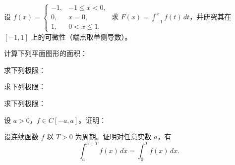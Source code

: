 \newpage
\noindent\begin{minipage}{\textwidth}
设 $f(x)=\begin{cases}-1,&-1\le x<0,\\0,&x=0,\\1,&0<x\le1.\end{cases}$ 求 $F(x)=\int_{-1}^x f(t)\,dt$，并研究其在 $[-1,1]$ 上的可微性（端点取单侧导数）。
\end{minipage}\par\vfill
\noindent\begin{minipage}{\textwidth}
计算下列平面图形的面积：
\end{minipage}\par\vfill
\noindent\begin{minipage}{\textwidth}
求下列极限：
\end{minipage}\par\vfill
\noindent\begin{minipage}{\textwidth}
求下列极限：
\end{minipage}\par\vfill
\newpage
\noindent\begin{minipage}{\textwidth}
求下列极限：
\end{minipage}\par\vfill
\noindent\begin{minipage}{\textwidth}
设 $a>0$，$f\in C[-a,a]$。证明：
\end{minipage}\par\vfill
\noindent\begin{minipage}{\textwidth}
设连续函数 $f$ 以 $T>0$ 为周期。证明对任意实数 $a$，有\[\int_a^{a+T}f(x)\,dx=\int_0^T f(x)\,dx.\]
\end{minipage}\par\vfill
